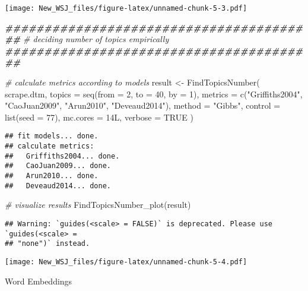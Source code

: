 \documentclass[
]{article}
\newenvironment{Shaded}{\begin{snugshade}}{\end{snugshade}}
\newcommand{\AttributeTok}[1]{\textcolor[rgb]{0.77,0.63,0.00}{#1}}
\newcommand{\CommentTok}[1]{\textcolor[rgb]{0.56,0.35,0.01}{\textit{#1}}}
\newcommand{\ConstantTok}[1]{\textcolor[rgb]{0.00,0.00,0.00}{#1}}
\newcommand{\DecValTok}[1]{\textcolor[rgb]{0.00,0.00,0.81}{#1}}
\newcommand{\DocumentationTok}[1]{\textcolor[rgb]{0.56,0.35,0.01}{\textbf{\textit{#1}}}}
\newcommand{\FunctionTok}[1]{\textcolor[rgb]{0.00,0.00,0.00}{#1}}
\newcommand{\NormalTok}[1]{#1}
\newcommand{\OtherTok}[1]{\textcolor[rgb]{0.56,0.35,0.01}{#1}}
\newcommand{\StringTok}[1]{\textcolor[rgb]{0.31,0.60,0.02}{#1}}
\begin{document}
\texttt{[image: New\_WSJ\_files/figure-latex/unnamed-chunk-5-3.pdf]}

\begin{Shaded}
\begin{Highlighting}[]
\DocumentationTok{\#\#\#\#\#\#\#\#\#\#\#\#\#\#\#\#\#\#\#\#\#\#\#\#\#\#\#\#\#\#\#\#\#\#\#\#\#\#\#\#}
\CommentTok{\# deciding number of topics empirically}
\DocumentationTok{\#\#\#\#\#\#\#\#\#\#\#\#\#\#\#\#\#\#\#\#\#\#\#\#\#\#\#\#\#\#\#\#\#\#\#\#\#\#\#\#}

\CommentTok{\# calculate metrics according to models}
\NormalTok{result }\OtherTok{\textless{}{-}} \FunctionTok{FindTopicsNumber}\NormalTok{(}
\NormalTok{  scrape.dtm,}
  \AttributeTok{topics =} \FunctionTok{seq}\NormalTok{(}\AttributeTok{from =} \DecValTok{2}\NormalTok{, }\AttributeTok{to =} \DecValTok{40}\NormalTok{, }\AttributeTok{by =} \DecValTok{1}\NormalTok{),}
  \AttributeTok{metrics =} \FunctionTok{c}\NormalTok{(}\StringTok{"Griffiths2004"}\NormalTok{, }\StringTok{"CaoJuan2009"}\NormalTok{, }\StringTok{"Arun2010"}\NormalTok{, }\StringTok{"Deveaud2014"}\NormalTok{),}
  \AttributeTok{method =} \StringTok{"Gibbs"}\NormalTok{,}
  \AttributeTok{control =} \FunctionTok{list}\NormalTok{(}\AttributeTok{seed =} \DecValTok{77}\NormalTok{),}
  \AttributeTok{mc.cores =}\NormalTok{ 14L,}
  \AttributeTok{verbose =} \ConstantTok{TRUE}
\NormalTok{)}
\end{Highlighting}
\end{Shaded}

\begin{verbatim}
## fit models... done.
## calculate metrics:
##   Griffiths2004... done.
##   CaoJuan2009... done.
##   Arun2010... done.
##   Deveaud2014... done.
\end{verbatim}

\begin{Shaded}
\begin{Highlighting}[]
\CommentTok{\# visualize results}
\FunctionTok{FindTopicsNumber\_plot}\NormalTok{(result)}
\end{Highlighting}
\end{Shaded}

\begin{verbatim}
## Warning: `guides(<scale> = FALSE)` is deprecated. Please use `guides(<scale> =
## "none")` instead.
\end{verbatim}

\texttt{[image: New\_WSJ\_files/figure-latex/unnamed-chunk-5-4.pdf]}

Word Embeddings
\end{document}

